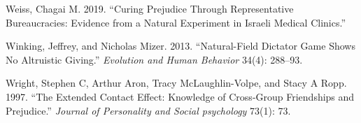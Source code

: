 \documentclass[11pt]{article}
\begin{document}
\begin{cslreferences}
\leavevmode\hypertarget{ref-weiss2019curing}{}%
Weiss, Chagai M. 2019. ``Curing Prejudice Through Representative
Bureaucracies: Evidence from a Natural Experiment in Israeli Medical
Clinics.''

\leavevmode\hypertarget{ref-winking2013natural}{}%
Winking, Jeffrey, and Nicholas Mizer. 2013. ``Natural-Field Dictator
Game Shows No Altruistic Giving.'' \emph{Evolution and Human Behavior}
34(4): 288--93.

\leavevmode\hypertarget{ref-wright1997extended}{}%
Wright, Stephen C, Arthur Aron, Tracy McLaughlin-Volpe, and Stacy A
Ropp. 1997. ``The Extended Contact Effect: Knowledge of Cross-Group
Friendships and Prejudice.'' \emph{Journal of Personality and Social
psychology} 73(1): 73.
\end{cslreferences}
\end{document}

